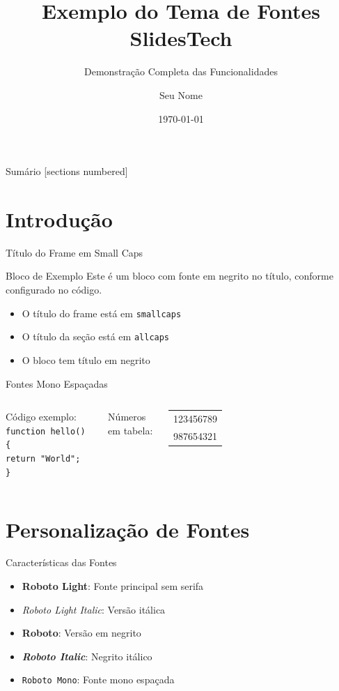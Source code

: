 \documentclass[10pt]{beamer}
\title{Exemplo do Tema de Fontes SlidesTech}
\subtitle{Demonstração Completa das Funcionalidades}
\author{Seu Nome}
\date{\today}
\begin{document}
\begin{frame}
  \titlepage
\end{frame}

\begin{frame}{Sumário}
  [sections numbered]
  \tableofcontents[hideallsubsections]
\end{frame}

\section{Introdução}
\begin{frame}{Título do Frame em Small Caps}
  \begin{block}{Bloco de Exemplo}
    Este é um bloco com fonte em negrito no título, conforme configurado no código.
  \end{block}
  
  \begin{itemize}
    \item O título do frame está em \texttt{smallcaps}
    \item O título da seção está em \texttt{allcaps}
    \item O bloco tem título em negrito
  \end{itemize}
\end{frame}

\begin{frame}{Fontes Mono Espaçadas}
  \begin{columns}[T]
    Código exemplo:
    \texttt{function hello() \{ \\
    \quad return "World"; \\
    \}}
    
    Números em tabela:
    \begin{tabular}{r}
      \hline
      123456789 \\
      987654321 \\
      \hline
    \end{tabular}
  \end{columns}
\end{frame}

\section{Personalização de Fontes}
\begin{frame}{Características das Fontes}
  \begin{itemize}
    \item \textbf{Roboto Light}: Fonte principal sem serifa
    \item \textit{Roboto Light Italic}: Versão itálica
    \item \textbf{Roboto}: Versão em negrito
    \item \textbf{\textit{Roboto Italic}}: Negrito itálico
    \item \texttt{Roboto Mono}: Fonte mono espaçada
  \end{itemize}
\end{frame}
\end{document}
